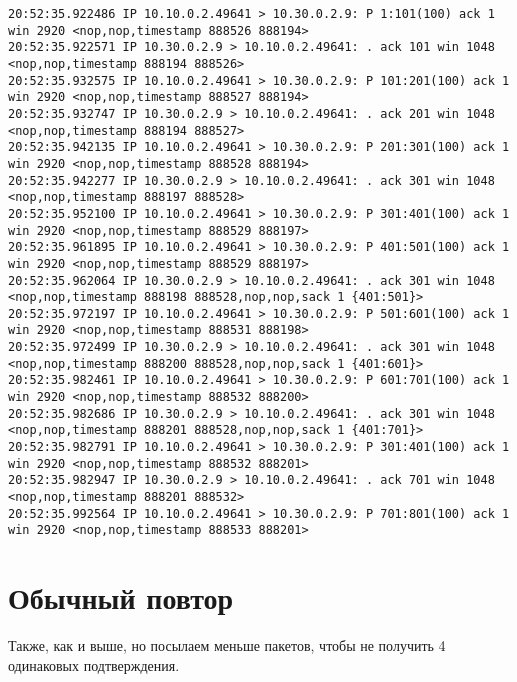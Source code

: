 \documentclass[a4paper,12pt]{article}
\begin{document}
\begin{lstlisting}
20:52:35.922486 IP 10.10.0.2.49641 > 10.30.0.2.9: P 1:101(100) ack 1 win 2920 <nop,nop,timestamp 888526 888194>
20:52:35.922571 IP 10.30.0.2.9 > 10.10.0.2.49641: . ack 101 win 1048 <nop,nop,timestamp 888194 888526>
20:52:35.932575 IP 10.10.0.2.49641 > 10.30.0.2.9: P 101:201(100) ack 1 win 2920 <nop,nop,timestamp 888527 888194>
20:52:35.932747 IP 10.30.0.2.9 > 10.10.0.2.49641: . ack 201 win 1048 <nop,nop,timestamp 888194 888527>
20:52:35.942135 IP 10.10.0.2.49641 > 10.30.0.2.9: P 201:301(100) ack 1 win 2920 <nop,nop,timestamp 888528 888194>
20:52:35.942277 IP 10.30.0.2.9 > 10.10.0.2.49641: . ack 301 win 1048 <nop,nop,timestamp 888197 888528>
20:52:35.952100 IP 10.10.0.2.49641 > 10.30.0.2.9: P 301:401(100) ack 1 win 2920 <nop,nop,timestamp 888529 888197>
20:52:35.961895 IP 10.10.0.2.49641 > 10.30.0.2.9: P 401:501(100) ack 1 win 2920 <nop,nop,timestamp 888529 888197>
20:52:35.962064 IP 10.30.0.2.9 > 10.10.0.2.49641: . ack 301 win 1048 <nop,nop,timestamp 888198 888528,nop,nop,sack 1 {401:501}>
20:52:35.972197 IP 10.10.0.2.49641 > 10.30.0.2.9: P 501:601(100) ack 1 win 2920 <nop,nop,timestamp 888531 888198>
20:52:35.972499 IP 10.30.0.2.9 > 10.10.0.2.49641: . ack 301 win 1048 <nop,nop,timestamp 888200 888528,nop,nop,sack 1 {401:601}>
20:52:35.982461 IP 10.10.0.2.49641 > 10.30.0.2.9: P 601:701(100) ack 1 win 2920 <nop,nop,timestamp 888532 888200>
20:52:35.982686 IP 10.30.0.2.9 > 10.10.0.2.49641: . ack 301 win 1048 <nop,nop,timestamp 888201 888528,nop,nop,sack 1 {401:701}>
20:52:35.982791 IP 10.10.0.2.49641 > 10.30.0.2.9: P 301:401(100) ack 1 win 2920 <nop,nop,timestamp 888532 888201>
20:52:35.982947 IP 10.30.0.2.9 > 10.10.0.2.49641: . ack 701 win 1048 <nop,nop,timestamp 888201 888532>
20:52:35.992564 IP 10.10.0.2.49641 > 10.30.0.2.9: P 701:801(100) ack 1 win 2920 <nop,nop,timestamp 888533 888201>
\end{lstlisting}

\section{Обычный повтор}

Также, как и выше, но посылаем меньше пакетов, чтобы не получить 4 одинаковых подтверждения.
\end{document}
